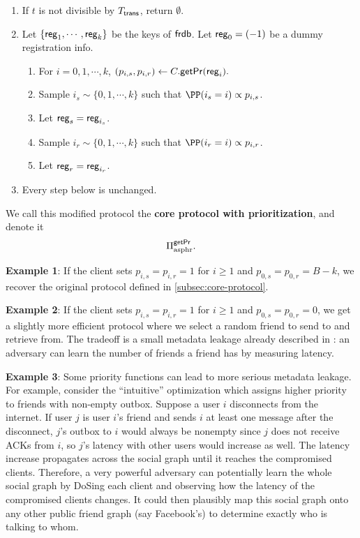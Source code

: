 \begin{enumerate}
    \item If $t$ is not divisible by $T_{\mathsf{trans}}$, return $\emptyset$.
    \item Let $\{\mathsf{reg}_1, \cdots, \mathsf{reg}_k\}$ be the keys of $\mathsf{frdb}$. Let $\mathsf{reg}_0 = (-1)$ be a dummy registration info. 
    \begin{enumerate}
        \item For $i = 0,1,\cdots, k$, $(p_{i, s}, p_{i, r}) \leftarrow C.\mathsf{getPr}(\mathsf{reg}_i).$
        
        \item Sample $i_s \sim \{0, 1,\cdots, k\}$ such that $\PP(i_s = i) \propto p_{i, s}$. 
        \item Let $\mathsf{reg}_s = \mathsf{reg}_{i_s}$.
        \item Sample $i_r \sim \{0, 1,\cdots, k\}$ such that $\PP(i_r = i) \propto p_{i, r}$. 
        \item Let $\mathsf{reg}_r = \mathsf{reg}_{i_r}$.
    \end{enumerate}
    \item Every step below is unchanged.
\end{enumerate}
We call this modified protocol the \textbf{core protocol with prioritization}, and denote it
$$\Pi_{\text{asphr}}^{\mathsf{getPr}}.$$

\textbf{Example 1}: If the client sets $p_{i, s} = p_{i, r} = 1$ for $i \geq 1$ and $p_{0, s} = p_{0, r} = B - k$, we recover the original protocol defined in \cref{subsec:core-protocol}.

\textbf{Example 2}: If the client sets $p_{i, s} = p_{i, r} = 1$ for $i \geq 1$ and $p_{0, s} = p_{0, r} = 0$, we get a slightly more efficient protocol where we select a random friend to send to and retrieve from. The tradeoff is a small metadata leakage already described in \cite{angel2018cf}: an adversary can learn the number of friends a friend has by measuring latency.

\textbf{Example 3}: Some priority functions can lead to more serious metadata leakage. For example, consider the ``intuitive'' optimization which assigns higher priority to friends with non-empty outbox. Suppose a user $i$ disconnects from the internet. If user $j$ is user $i$'s friend and sends $i$ at least one message after the disconnect, $j$'s outbox to $i$ would always be nonempty since $j$ does not receive ACKs from $i$, so $j$'s latency with other users would increase as well. The latency increase propagates across the social graph until it reaches the compromised clients. Therefore, a very powerful adversary can potentially learn the whole social graph by DoSing each client and observing how the latency of the compromised clients changes. It could then plausibly map this social graph onto any other public friend graph (say Facebook's) to determine exactly who is talking to whom.

